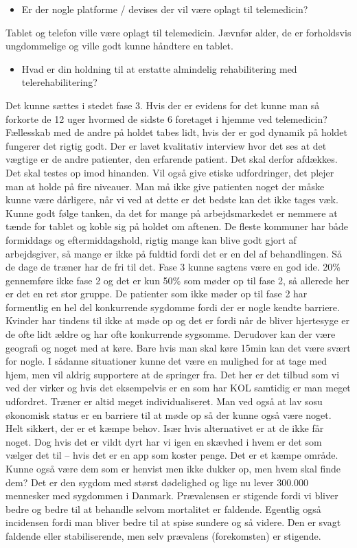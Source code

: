 \begin{itemize}
	\item Er der nogle platforme / devises der vil være oplagt til telemedicin? 
\end{itemize} 
Tablet og telefon ville være oplagt til telemedicin. Jævnfør alder, de er forholdsvis ungdommelige og ville godt kunne håndtere en tablet. 

\begin{itemize}
	\item Hvad er din holdning til at erstatte almindelig rehabilitering med telerehabilitering? 
\end{itemize} 
Det kunne sættes i stedet fase 3. Hvis der er evidens for det kunne man så forkorte de 12 uger hvormed de sidste 6 foretaget i hjemme ved telemedicin? Fællesskab med de andre på holdet tabes lidt, hvis der er god dynamik på holdet fungerer det rigtig godt. Der er lavet kvalitativ interview hvor det ses at det vægtige er de andre patienter, den erfarende patient. Det skal derfor afdækkes. Det skal testes op imod hinanden. Vil også give etiske udfordringer, det plejer man at holde på fire niveauer. Man må ikke give patienten noget der måske kunne være dårligere, når vi ved at dette er det bedste kan det ikke tages væk. Kunne godt følge tanken, da det for mange på arbejdsmarkedet er nemmere at tænde for tablet og koble sig på holdet om aftenen. De fleste kommuner har både formiddags og eftermiddagshold, rigtig mange kan blive godt gjort af arbejdsgiver, så mange er ikke på fuldtid fordi det er en del af behandlingen. Så de dage de træner har de fri til det. Fase 3 kunne sagtens være en god ide. 20\% gennemføre ikke fase 2 og det er kun 50\% som møder op til fase 2, så allerede her er det en ret stor gruppe. De patienter som ikke møder op til fase 2 har formentlig en hel del konkurrende sygdomme fordi der er nogle kendte barriere. Kvinder har tindens til ikke at møde op og det er fordi når de bliver hjertesyge er de ofte lidt ældre og har ofte konkurrende sygsomme. Derudover kan der være geografi og noget med at køre. Bare hvis man skal køre 15min kan det være svært for nogle. I sådanne situationer kunne det være en mulighed for at tage med hjem, men vil aldrig supportere at de springer fra. Det her er det tilbud som vi ved der virker og hvis det eksempelvis er en som har KOL samtidig er man meget udfordret. Træner er altid meget individualiseret. Man ved også at lav sosu økonomisk status er en barriere til at møde op så der kunne også være noget. Helt sikkert, der er et kæmpe behov. Især hvis alternativet er at de ikke får noget. Dog hvis det er vildt dyrt har vi igen en skævhed i hvem er det som vælger det til – hvis det er en app som koster penge. Det er et kæmpe område. Kunne også være dem som er henvist men ikke dukker op, men hvem skal finde dem? Det er den sygdom med størst dødelighed og lige nu lever 300.000 mennesker med sygdommen i Danmark. Prævalensen er stigende fordi vi bliver bedre og bedre til at behandle selvom mortalitet er faldende. Egentlig også incidensen fordi man bliver bedre til at spise sundere og så videre. Den er svagt faldende eller stabiliserende, men selv prævalens (forekomsten) er stigende.

